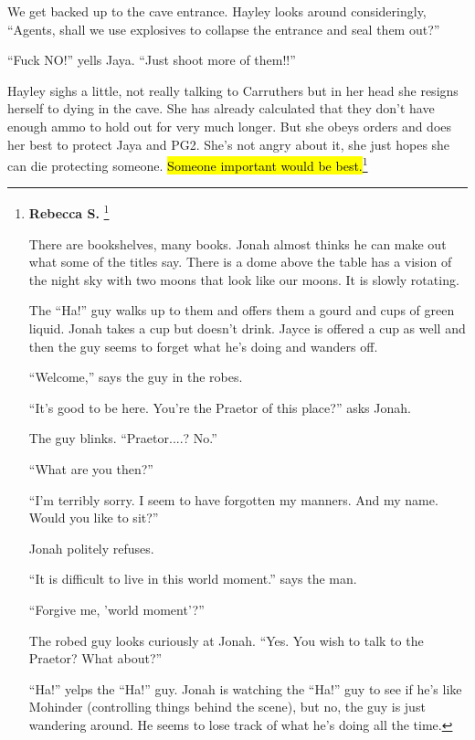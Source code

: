 We get backed up to the cave entrance.  Hayley looks around consideringly,  ``Agents, shall we use explosives to collapse the entrance and seal them out?''

``Fuck NO!'' yells Jaya.  ``Just shoot more of them!!''

Hayley sighs a little, not really talking to Carruthers but in her head she resigns herself to dying in the cave.  She has already calculated that they don't have enough ammo to hold out for very much longer.  But she obeys orders and does her best to protect Jaya and PG2.  She's not angry about it, she just hopes she can die protecting someone.  \hl{Someone important would be best.}\footnote{\textbf{Rebecca S. }\footnote{$\rightarrow$\textbf{Suko T }She knows the value of her life, she doesn't want to martyr herself for some schmoe. \textsubscript{11/18/14 11:59am}}





There are bookshelves, many books.  Jonah almost thinks he can make out what some of the titles say.  There is a dome above the table has a vision of the night sky with two moons that look like our moons.  It is slowly rotating.



The ``Ha!'' guy walks up to them and offers them a gourd and cups of green liquid.  Jonah takes a cup but doesn't drink.  Jayce is offered a cup as well and then the guy seems to forget what he's doing and wanders off.



``Welcome,'' says the guy in the robes.

``It's good to be here.  You're the Praetor of this place?'' asks Jonah.

The guy blinks. ``Praetor....?  No.''

``What are you then?''

``I'm terribly sorry.  I seem to have forgotten my manners.  And my name.  Would you like to sit?''

Jonah politely refuses.

``It is difficult to live in this world moment.'' says the man.

``Forgive me, 'world moment'?''

The robed guy looks curiously at Jonah. ``Yes.  You wish to talk to the Praetor?  What about?''

``Ha!'' yelps the ``Ha!'' guy.  Jonah is watching the ``Ha!'' guy to see if he's like Mohinder (controlling things behind the scene), but no, the guy is just wandering around.  He seems to lose track of what he's doing all the time.

}
